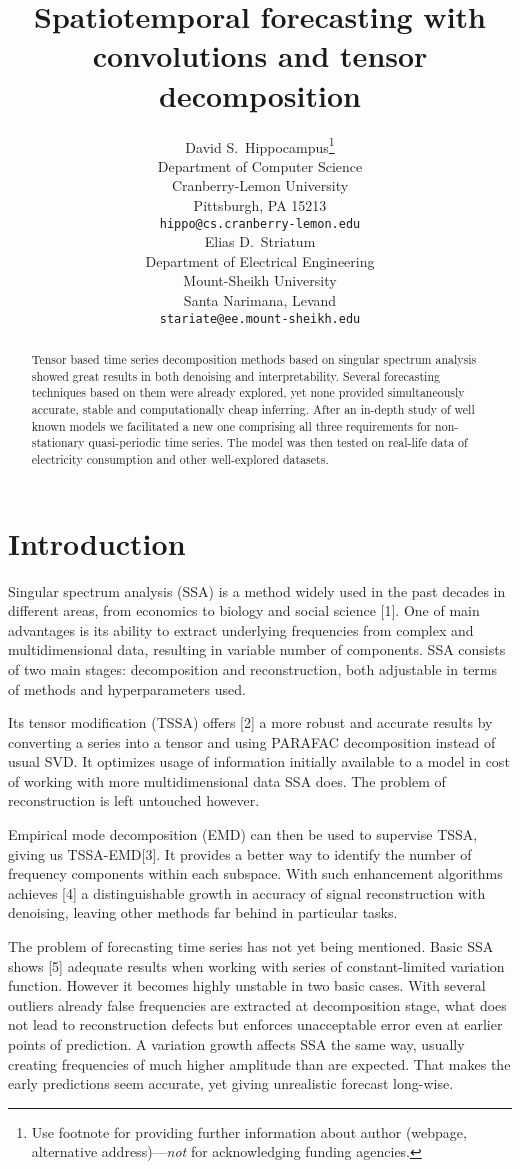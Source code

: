 \documentclass{article}
\title{Spatiotemporal forecasting with convolutions and tensor decomposition}
\author{ David S.~Hippocampus\thanks{Use footnote for providing further
		information about author (webpage, alternative
		address)---\emph{not} for acknowledging funding agencies.} \\
	Department of Computer Science\\
	Cranberry-Lemon University\\
	Pittsburgh, PA 15213 \\
	\texttt{hippo@cs.cranberry-lemon.edu} \\
	\And
	Elias D.~Striatum \\
	Department of Electrical Engineering\\
	Mount-Sheikh University\\
	Santa Narimana, Levand \\
	\texttt{stariate@ee.mount-sheikh.edu} \\
}
\date{}
\begin{document}
\maketitle

\begin{abstract}
Tensor based time series decomposition methods based on singular spectrum analysis showed great results in both denoising and interpretability. Several forecasting techniques based on them were already explored, yet none provided simultaneously accurate, stable and computationally cheap inferring. After an in-depth study of well known models we facilitated a new one comprising all three requirements for non-stationary quasi-periodic time series. The model was then tested on real-life data of electricity consumption and other well-explored datasets. 
\end{abstract}



\section{Introduction}
Singular spectrum analysis (SSA) is a method widely used in the past decades in different areas, from economics to biology and social science [1].  One of main advantages is its ability to extract underlying frequencies from complex and multidimensional data, resulting in  variable number of components. SSA consists of two main stages: decomposition and reconstruction, both adjustable in terms of methods and hyperparameters used.

Its tensor modification (TSSA) offers [2] a more robust and accurate results by converting a series into a tensor and using PARAFAC decomposition instead of usual SVD. It optimizes usage of information initially available to a model in cost of working with more multidimensional data SSA does. The problem of reconstruction is left untouched however.

Empirical mode decomposition (EMD) can then be used  to supervise TSSA, giving us TSSA-EMD[3]. It provides a better way to identify the number of frequency components within each subspace. With such enhancement algorithms achieves [4] a distinguishable growth in accuracy of signal reconstruction with denoising, leaving other methods far behind in particular tasks.

The problem of forecasting time series has not yet being mentioned. Basic SSA shows [5] adequate results when working with series of constant-limited variation function. However it becomes highly unstable in two basic cases. With several outliers already false frequencies are extracted at decomposition stage, what does not lead to reconstruction defects but enforces unacceptable error even at earlier points of prediction. A variation growth affects SSA the same way, usually creating frequencies of much higher amplitude than are expected. That makes the early predictions seem accurate, yet giving unrealistic forecast long-wise.
\end{document}
